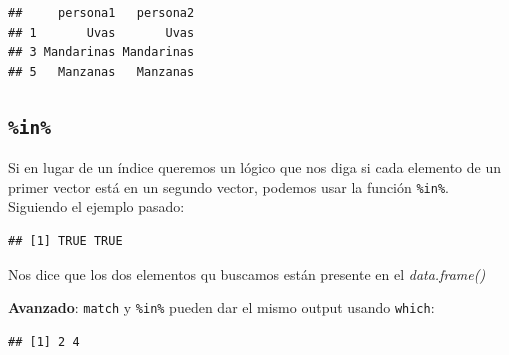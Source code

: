 \documentclass[
]{book}
\newenvironment{Shaded}{\begin{snugshade}}{\end{snugshade}}
\newcommand{\FunctionTok}[1]{\textcolor[rgb]{0.13,0.29,0.53}{\textbf{#1}}}
\newcommand{\NormalTok}[1]{#1}
\newcommand{\SpecialCharTok}[1]{\textcolor[rgb]{0.81,0.36,0.00}{\textbf{#1}}}
\newcommand{\StringTok}[1]{\textcolor[rgb]{0.31,0.60,0.02}{#1}}
\begin{document}
\begin{verbatim}
##     persona1   persona2
## 1       Uvas       Uvas
## 3 Mandarinas Mandarinas
## 5   Manzanas   Manzanas
\end{verbatim}

\subsection{\texorpdfstring{\texttt{\%in\%}}{\%in\%}}\label{in}

Si en lugar de un índice queremos un lógico que nos diga si cada elemento de un primer vector está en un segundo vector, podemos usar la función \texttt{\%in\%}.
Siguiendo el ejemplo pasado:

\begin{Shaded}
\end{Shaded}

\begin{verbatim}
## [1] TRUE TRUE
\end{verbatim}

Nos dice que los dos elementos qu buscamos están presente en el \emph{data.frame()}

\textbf{Avanzado}: \texttt{match} y \texttt{\%in\%} pueden dar el mismo output usando \texttt{which}:

\begin{Shaded}
\end{Shaded}

\begin{verbatim}
## [1] 2 4
\end{verbatim}

\begin{Shaded}
\end{Shaded}
\end{document}
